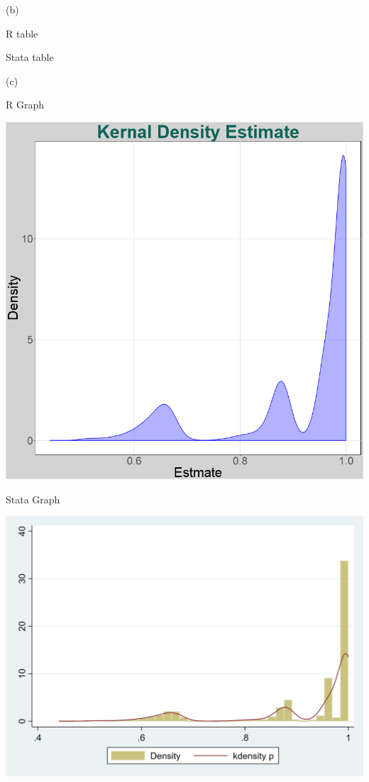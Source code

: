\documentclass[11pt]{article}
\begin{document}
(b)

\centerline{R table }

\begin{center}
	
\end{center}


\centerline{Stata table }
\begin{center}
	
\end{center}



(c)
\centerline{R Graph }
\begin{center}
	\includegraphics[width=.8\linewidth]{plot_q1_9_c.png}
	
\end{center}

\centerline{Stata Graph }
\begin{center}
	\includegraphics[width=.8\linewidth]{stata_plot_q1_9_c.png}
	
\end{center}
\end{document}

